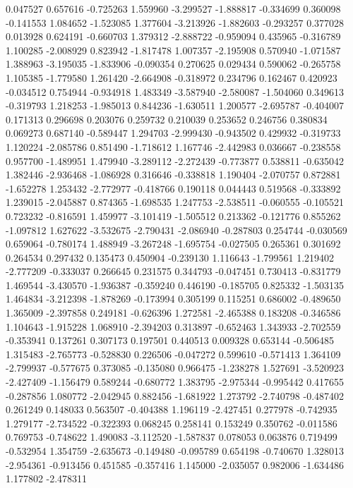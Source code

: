 0.047527
0.657616
-0.725263
1.559960
-3.299527
-1.888817
-0.334699
0.360098
-0.141553
1.084652
-1.523085
1.377604
-3.213926
-1.882603
-0.293257
0.377028
0.013928
0.624191
-0.660703
1.379312
-2.888722
-0.959094
0.435965
-0.316789
1.100285
-2.008929
0.823942
-1.817478
1.007357
-2.195908
0.570940
-1.071587
1.388963
-3.195035
-1.833906
-0.090354
0.270625
0.029434
0.590062
-0.265758
1.105385
-1.779580
1.261420
-2.664908
-0.318972
0.234796
0.162467
0.420923
-0.034512
0.754944
-0.934918
1.483349
-3.587940
-2.580087
-1.504060
0.349613
-0.319793
1.218253
-1.985013
0.844236
-1.630511
1.200577
-2.695787
-0.404007
0.171313
0.296698
0.203076
0.259732
0.210039
0.253652
0.246756
0.380834
0.069273
0.687140
-0.589447
1.294703
-2.999430
-0.943502
0.429932
-0.319733
1.120224
-2.085786
0.851490
-1.718612
1.167746
-2.442983
0.036667
-0.238558
0.957700
-1.489951
1.479940
-3.289112
-2.272439
-0.773877
0.538811
-0.635042
1.382446
-2.936468
-1.086928
0.316646
-0.338818
1.190404
-2.070757
0.872881
-1.652278
1.253432
-2.772977
-0.418766
0.190118
0.044443
0.519568
-0.333892
1.239015
-2.045887
0.874365
-1.698535
1.247753
-2.538511
-0.060555
-0.105521
0.723232
-0.816591
1.459977
-3.101419
-1.505512
0.213362
-0.121776
0.855262
-1.097812
1.627622
-3.532675
-2.790431
-2.086940
-0.287803
0.254744
-0.030569
0.659064
-0.780174
1.488949
-3.267248
-1.695754
-0.027505
0.265361
0.301692
0.264534
0.297432
0.135473
0.450904
-0.239130
1.116643
-1.799561
1.219402
-2.777209
-0.333037
0.266645
0.231575
0.344793
-0.047451
0.730413
-0.831779
1.469544
-3.430570
-1.936387
-0.359240
0.446190
-0.185705
0.825332
-1.503135
1.464834
-3.212398
-1.878269
-0.173994
0.305199
0.115251
0.686002
-0.489650
1.365009
-2.397858
0.249181
-0.626396
1.272581
-2.465388
0.183208
-0.346586
1.104643
-1.915228
1.068910
-2.394203
0.313897
-0.652463
1.343933
-2.702559
-0.353941
0.137261
0.307173
0.197501
0.440513
0.009328
0.653144
-0.506485
1.315483
-2.765773
-0.528830
0.226506
-0.047272
0.599610
-0.571413
1.364109
-2.799937
-0.577675
0.373085
-0.135080
0.966475
-1.238278
1.527691
-3.520923
-2.427409
-1.156479
0.589244
-0.680772
1.383795
-2.975344
-0.995442
0.417655
-0.287856
1.080772
-2.042945
0.882456
-1.681922
1.273792
-2.740798
-0.487402
0.261249
0.148033
0.563507
-0.404388
1.196119
-2.427451
0.277978
-0.742935
1.279177
-2.734522
-0.322393
0.068245
0.258141
0.153249
0.350762
-0.011586
0.769753
-0.748622
1.490083
-3.112520
-1.587837
0.078053
0.063876
0.719499
-0.532954
1.354759
-2.635673
-0.149480
-0.095789
0.654198
-0.740670
1.328013
-2.954361
-0.913456
0.451585
-0.357416
1.145000
-2.035057
0.982006
-1.634486
1.177802
-2.478311
